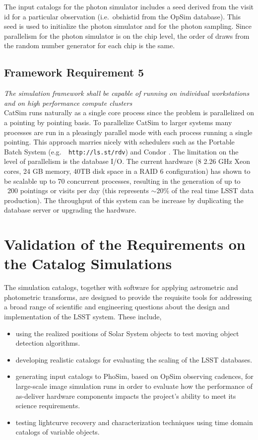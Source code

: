 \documentclass[11pt]{article}
\begin{document}
The input catalogs for the photon simulator includes a seed derived
from the visit id for a particular observation (i.e.\ obshistid from
the OpSim database). This seed is used to initialize the photon
simulator and for the photon sampling. Since parallelism for the
photon simulator is on the chip level, the order of draws from the
random number generator for each chip is the same.


\subsection{Framework Requirement 5}

{\it The simulation framework shall be capable of running on individual workstations 
and on high performance compute clusters}\\


CatSim runs naturally as a single core process since the problem is
parallelized on a pointing by pointing basis.  To parallelize CatSim
to larger systems many processes are run in a pleasingly parallel mode
with each process running a single pointing.  This approach marries
nicely with schedulers such as the Portable Batch System (e.g.\ {\tt
  http://ls.st/rdv}) and Condor \citep{condor}.  The
limitation on the level of parallelism is the database I/O.  The
current hardware (8 2.26 GHz Xeon cores, 24 GB memory, 40TB disk space
in a RAID 6 configuration) has shown to be scalable up to 70
concurrent processes, resulting in the generation of up to ~200
pointings or visits per day (this represents $\sim$20\% of the real
time LSST data production).  The throughput of this system can be
increase by duplicating the database server or upgrading the hardware.

\section{Validation of the Requirements on the Catalog Simulations}

The simulation catalogs, together with software for applying
astrometric and photometric transforms, are designed to provide the
requisite tools for addressing a broad range of scientific and
engineering questions about the design and implementation of the LSST
system. These include,
\begin{itemize}
\item using the realized positions of Solar System objects to
  test moving object detection algorithms.
\item developing realistic  catalogs for evaluating the scaling of the LSST databases.
\item generating input catalogs to PhoSim, based on OpSim observing
  cadences, for large-scale image simulation runs in order to evaluate
  how the performance of as-deliver hardware components impacts the
  project's ability to meet its science requirements.
\item testing lightcurve recovery and characterization techniques
  using time domain catalogs of variable objects.
\end{itemize}
\end{document}
